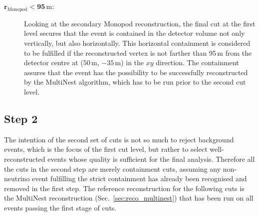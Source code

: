\begin{description}
\item[$\mathbf{r_\mathrm{Monopod} < 95}$\,m:] Looking at the secondary 
  Monopod reconstruction, the final cut at the first level secures that the
  event is contained in the detector volume not only vertically, but also
  horizontally. This horizontal containment is considered to be fulfilled if
  the reconstructed vertex is not farther than 95\,m from the detector centre
  at ($50$\,m, $-35$\,m) in the $xy$ direction. The containment assures that
  the event has the possibility to be successfully reconstructed by the
  MultiNest algorithm, which has to be run prior to the second cut level.
\end{description}


\subsection{Step 2}
\label{sec:cuts_step2}

The intention of the second set of cuts is not so much to reject background
events, which is the focus of the first cut level, but rather to select
well-reconstructed events whose quality is sufficient for the final analysis.
Therefore all the cuts in the second step are merely containment cuts, assuming
any non-neutrino event fulfilling the strict containment has already been
recognised and removed in the first step. The reference reconstruction for the
following cuts is the MultiNest reconstruction (Sec.~\ref{sec:reco_multinest})
that has been run on all events passing the first stage of cuts.

